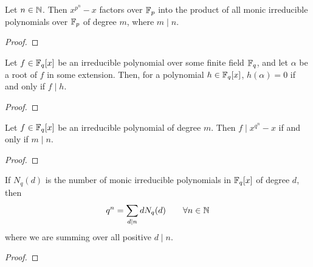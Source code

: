 \begin{proposition}
    Let \(n \in \mathbb{N}\).
    Then \(x^{p^n} - x\) factors over \(\mathbb{F}_p\)
    into the product of all monic irreducible polynomials over \(\mathbb{F}_p\)
    of degree \(m\), where \(m \mid n\).
\end{proposition}
\begin{proof}
\end{proof}

\begin{lemma}
    Let \(f \in \mathbb{F}_q[x]\) be an irreducible polynomial over some finite field \(\mathbb{F}_q\),
    and let \(\alpha\) be a root of \(f\) in some extension.
    Then, for a polynomial \(h \in \mathbb{F}_q[x]\),
    \(h(\alpha) = 0\) if and only if \(f \mid h\).
\end{lemma}
\begin{proof}
\end{proof}
\begin{lemma}
    Let \(f \in \mathbb{F}_q[x]\) be an irreducible polynomial of degree \(m\).
    Then \(f \mid x^{q^n} - x\) if and only if \(m \mid n\).
\end{lemma}
\begin{proof}
\end{proof}
\begin{corollary}
    If \(N_q(d)\) is the number of monic irreducible polynomials
    in \(\mathbb{F}_q[x]\) of degree \(d\), then
    \begin{equation*}
        q^n = \sum_{d \mid n} d N_q(d) \qquad \forall n \in \mathbb{N}
    \end{equation*}
    where we are summing over all positive \(d \mid n\).
\end{corollary}
\begin{proof}
\end{proof}
